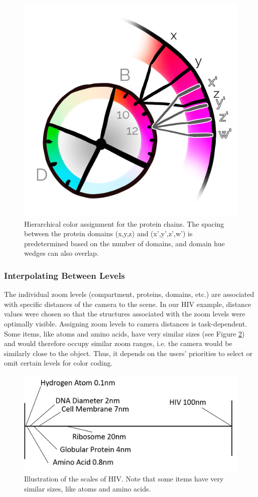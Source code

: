 \documentclass{egpubl}
\begin{document}
	
	\begin{figure}
		\centering
		\includegraphics[width=0.4\linewidth]{Figures/overlap}
		\caption{Hierarchical color assignment for the protein chains. 
			The spacing between the protein domains (x,y,z) and (x',y',z',w') is predetermined based on the number of domains, and domain hue wedges can also overlap. 
		}
		\label{fig:overlap}
	\end{figure}
	
	

	
	\subsubsection{Interpolating Between Levels}
	
	The individual zoom levels (compartment, proteins, domains, etc.) are associated with specific distances of the camera to the scene. 
	In our HIV example, distance values were chosen so that the structures associated with the zoom levels were optimally visible. 
	Assigning zoom levels to camera distances is task-dependent. 
	Some items, like atoms and amino acids, have very similar sizes (see Figure \ref{fig:hivScale}) and would therefore occupy similar zoom ranges, i.e. the camera would be similarly close to the object.
	Thus, it depends on the users' priorities to select or omit certain levels for color coding. 
	
	\begin{figure}
		\centering
		\includegraphics[width=0.7\linewidth]{Figures/hivscale}
		\caption{Illustration of the scales of HIV. Note that some items have very similar sizes, like atoms and amino acids. }
		\label{fig:hivScale}
	\end{figure}
	
\end{document}
